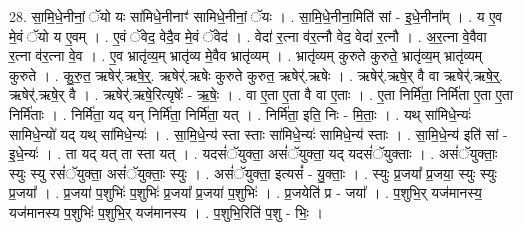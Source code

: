 \documentclass[17pt]{extarticle}
\begin{document}
28. सा॒मि॒धे॒नीनां॒ ॅयो यः सा॑मिधे॒नीनाꣳ॑ सामिधे॒नीनां॒ ॅयः । . सा॒मि॒धे॒नीना॒मिति॑ सां - इ॒धे॒नीना᳚म् । . य ए॒व मे॒वं ॅयो य ए॒वम् । . ए॒वं ॅवेद॒ वेदै॒व मे॒वं ॅवेद॑ । . वेदा॑ र॒त्ना व॑र॒त्नौ वेद॒ वेदा॑ र॒त्नौ । . अ॒र॒त्ना वे॒वैवा र॒त्ना व॑र॒त्ना वे॒व । . ए॒व भ्रातृ॑व्य॒म् भ्रातृ॑व्य मे॒वैव भ्रातृ॑व्यम् । . भ्रातृ॑व्यम् कुरुते कुरुते॒ भ्रातृ॑व्य॒म् भ्रातृ॑व्यम् कुरुते । . कु॒रु॒त॒ ऋषेर्॑.ऋषे॒र्॒. ऋषेर्॑.ऋषेः कुरुते कुरुत॒ ऋषेर्॑.ऋषेः । . ऋषेर्॑.ऋषे॒र् वै वा ऋषेर्॑.ऋषे॒र्॒. ऋषेर्॑.ऋषे॒र् वै । . ऋषेर्॑.ऋषे॒रित्यृषेः᳚ - ऋ॒षेः॒ । . वा ए॒ता ए॒ता वै वा ए॒ताः । . ए॒ता निर्मि॑ता॒ निर्मि॑ता ए॒ता ए॒ता निर्मि॑ताः । . निर्मि॑ता॒ यद् यन् निर्मि॑ता॒ निर्मि॑ता॒ यत् । . निर्मि॑ता॒ इति॒ निः - मि॒ताः॒ । . यथ् सा॑मिधे॒न्यः॑ सामिधे॒न्यो॑ यद् यथ् सा॑मिधे॒न्यः॑ । . सा॒मि॒धे॒न्य॑ स्ता स्ताः सा॑मिधे॒न्यः॑ सामिधे॒न्य॑ स्ताः । . सा॒मि॒धे॒न्य॑ इति॑ सां - इ॒धे॒न्यः॑ । . ता यद् यत् ता स्ता यत् । . यदसं॑ॅयुक्ता॒ असं॑ॅयुक्ता॒ यद् यदसं॑ॅयुक्ताः । . असं॑ॅयुक्ताः॒ स्युः स्यु रसं॑ॅयुक्ता॒ असं॑ॅयुक्ताः॒ स्युः । . असं॑ॅयुक्ता॒ इत्यसं᳚ - यु॒क्ताः॒ । . स्युः प्र॒जया᳚ प्र॒जया॒ स्युः स्युः प्र॒जया᳚ । . प्र॒जया॑ प॒शुभिः॑ प॒शुभिः॑ प्र॒जया᳚ प्र॒जया॑ प॒शुभिः॑ । . प्र॒जयेति॑ प्र - जया᳚ । . प॒शुभि॒र् यज॑मानस्य॒ यज॑मानस्य प॒शुभिः॑ प॒शुभि॒र् यज॑मानस्य । . प॒शुभि॒रिति॑ प॒शु - भिः॒ । \newline
\end{document}
